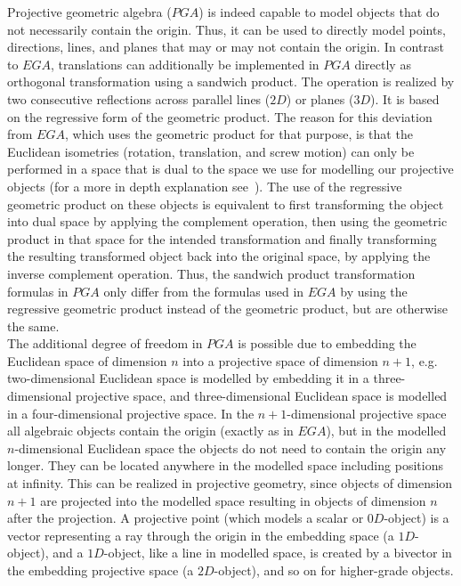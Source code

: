 Projective geometric algebra ($PGA$) is indeed capable to model objects that do not
necessarily contain the origin. Thus, it can be used to directly model points, directions,
lines, and planes that may or may not contain the origin. In contrast to $EGA$,
translations can additionally be implemented in $PGA$ directly as orthogonal
transformation using a sandwich product. The operation is realized by two consecutive
reflections across parallel lines ($2D$) or planes ($3D$). It is based on the regressive
form of the geometric product. The reason for this deviation from $EGA$, which uses the
geometric product for that purpose, is that the Euclidean isometries (rotation,
translation, and screw motion) can only be performed in a space that is dual to the space
we use for modelling our projective objects (for a more in depth explanation
see~\cite{Lengyel_pga-illuminated:2024}). The use of the regressive geometric product on
these objects is equivalent to first transforming the object into dual space by applying
the complement operation, then using the geometric product in that space for the intended
transformation and finally transforming the resulting transformed object back into the
original space, by applying the inverse complement operation. Thus, the sandwich product
transformation formulas in $PGA$ only differ from the formulas used in $EGA$ by using the
regressive geometric product instead of the geometric product, but are otherwise the same.
\\

The additional degree of freedom in $PGA$ is possible due to embedding the Euclidean space
of dimension $n$ into a projective space of dimension $n+1$, e.g. two-dimensional
Euclidean space is modelled by embedding it in a three-dimensional projective space, and
three-dimensional Euclidean space is modelled in a four-dimensional projective space. In
the $n+1$-dimensional projective space all algebraic objects contain the origin (exactly
as in $EGA$), but in the modelled $n$-dimensional Euclidean space the objects do not need
to contain the origin any longer. They can be located anywhere in the modelled space
including positions at infinity. This can be realized in projective geometry, since
objects of dimension $n+1$ are projected into the modelled space resulting in objects of
dimension $n$ after the projection. A projective point (which models a scalar or
$0D$-object) is a vector representing a ray through the origin in the embedding space (a
$1D$-object), and a $1D$-object, like a line in modelled space, is created by a bivector
in the embedding projective space (a $2D$-object), and so on for higher-grade objects. \\

